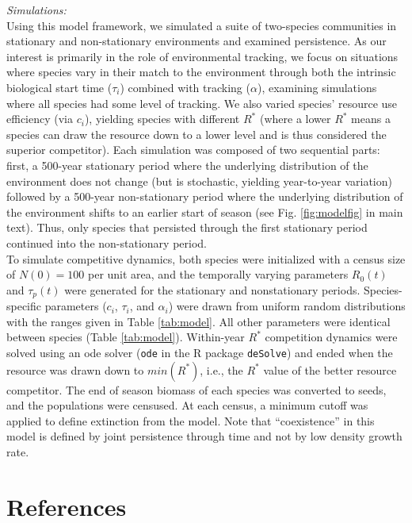 \documentclass[11pt,letter]{article}
\begin{document}
\noindent \emph{Simulations:}\\
Using this model framework, we simulated a suite of two-species communities in stationary and non-stationary environments and examined persistence. As our interest is primarily in the role of environmental tracking, we focus on situations where species vary in their match to the environment through both the intrinsic biological start time ($\tau_i$) combined with tracking ($\alpha$), examining simulations where all species had some level of tracking. We also varied species' resource use efficiency (via $c_i$), yielding species with different $R^*$ (where a lower $R^*$ means a species can draw the resource down to a lower level and is thus considered the superior competitor). Each simulation was composed of two sequential parts: first, a 500-year stationary period where the underlying distribution of the environment does not change (but is stochastic, yielding year-to-year variation) followed by a 500-year non-stationary period where the underlying distribution of the environment shifts to an earlier start of season (see Fig. \ref{fig:modelfig} in main text). Thus, only species that persisted through the first stationary period continued into the non-stationary period.  \\

To simulate competitive dynamics, both species were initialized with a census size of $N(0) = 100$ per unit area, and the temporally varying parameters $R_0(t)$ and $\tau_{p}(t)$ were generated for the stationary and nonstationary periods. Species-specific parameters ($c_{i}$, $\tau_{i}$, and $\alpha_{i}$) were drawn from uniform random distributions with the ranges given in Table \ref{tab:model}.  All other parameters were identical between species (Table \ref{tab:model}).  Within-year $R^{*}$ competition dynamics were solved using an ode solver (\verb|ode| in the R package \verb|deSolve|) and ended when the resource was drawn down to $min(R^{*})$, i.e., the $R^{*}$ value of the better resource competitor.  The end of season biomass of each species was converted to seeds, and the populations were censused.  At each census, a minimum cutoff was applied to define extinction from the model.  Note that ``coexistence'' in this model is defined by joint persistence through time and not by low density growth rate. 

\section{References}


\end{document}
